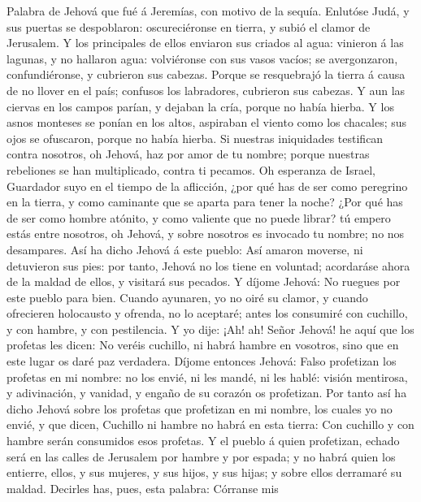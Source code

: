  Palabra de Jehová que fué á Jeremías, con motivo de la
sequía.  Enlutóse Judá, y sus puertas se despoblaron:
oscureciéronse en tierra, y subió el clamor de Jerusalem.  Y
los principales de ellos enviaron sus criados al agua: vinieron á las
lagunas, y no hallaron agua: volviéronse con sus vasos vacíos; se
avergonzaron, confundiéronse, y cubrieron sus cabezas. 
Porque se resquebrajó la tierra á causa de no llover en el país;
confusos los labradores, cubrieron sus cabezas.  Y aun las
ciervas en los campos parían, y dejaban la cría, porque no había hierba.
 Y los asnos monteses se ponían en los altos, aspiraban el
viento como los chacales; sus ojos se ofuscaron, porque no había hierba.
 Si nuestras iniquidades testifican contra nosotros, oh
Jehová, haz por amor de tu nombre; porque nuestras rebeliones se han
multiplicado, contra ti pecamos.  Oh esperanza de Israel,
Guardador suyo en el tiempo de la aflicción, ¿por qué has de ser como
peregrino en la tierra, y como caminante que se aparta para tener la
noche?  ¿Por qué has de ser como hombre atónito, y como
valiente que no puede librar? tú empero estás entre nosotros, oh Jehová,
y sobre nosotros es invocado tu nombre; no nos desampares. 
Así ha dicho Jehová á este pueblo: Así amaron moverse, ni detuvieron sus
pies: por tanto, Jehová no los tiene en voluntad; acordaráse ahora de la
maldad de ellos, y visitará sus pecados.  Y díjome Jehová:
No ruegues por este pueblo para bien.  Cuando ayunaren, yo
no oiré su clamor, y cuando ofrecieren holocausto y ofrenda, no lo
aceptaré; antes los consumiré con cuchillo, y con hambre, y con
pestilencia.  Y yo dije: ¡Ah! ah! Señor Jehová! he aquí que
los profetas les dicen: No veréis cuchillo, ni habrá hambre en vosotros,
sino que en este lugar os daré paz verdadera.  Díjome
entonces Jehová: Falso profetizan los profetas en mi nombre: no los
envié, ni les mandé, ni les hablé: visión mentirosa, y adivinación, y
vanidad, y engaño de su corazón os profetizan.  Por tanto
así ha dicho Jehová sobre los profetas que profetizan en mi nombre, los
cuales yo no envié, y que dicen, Cuchillo ni hambre no habrá en esta
tierra: Con cuchillo y con hambre serán consumidos esos profetas.
 Y el pueblo á quien profetizan, echado será en las calles
de Jerusalem por hambre y por espada; y no habrá quien los entierre,
ellos, y sus mujeres, y sus hijos, y sus hijas; y sobre ellos derramaré
su maldad.  Decirles has, pues, esta palabra: Córranse mis
